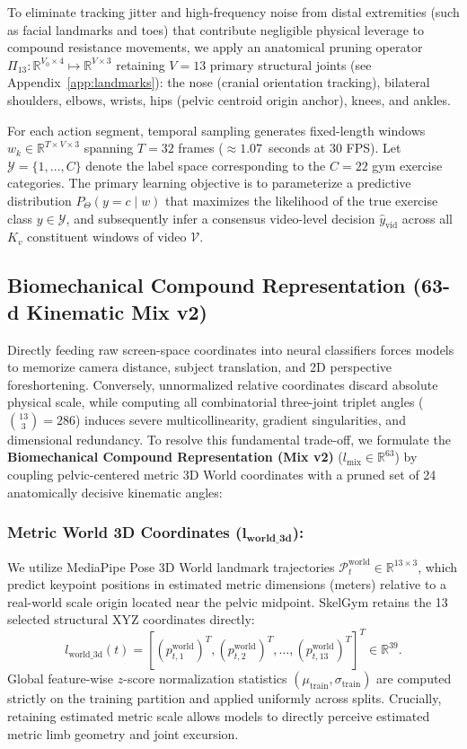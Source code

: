 \documentclass[preprint,12pt]{elsarticle}
\begin{document}
To eliminate tracking jitter and high-frequency noise from distal extremities (such as facial landmarks and toes) that contribute negligible physical leverage to compound resistance movements, we apply an anatomical pruning operator $\Pi_{13}: \mathbb{R}^{V_0 \times 4} \mapsto \mathbb{R}^{V \times 3}$ retaining $V = 13$ primary structural joints (see Appendix~\ref{app:landmarks}): the nose (cranial orientation tracking), bilateral shoulders, elbows, wrists, hips (pelvic centroid origin anchor), knees, and ankles.

For each action segment, temporal sampling generates fixed-length windows $w_k \in \mathbb{R}^{T \times V \times 3}$ spanning $T = 32$ frames ($\approx 1.07$~seconds at 30 FPS). Let $\mathcal{Y} = \{1, \dots, C\}$ denote the label space corresponding to the $C = 22$ gym exercise categories. The primary learning objective is to parameterize a predictive distribution $P_\Theta(y = c \mid w)$ that maximizes the likelihood of the true exercise class $y \in \mathcal{Y}$, and subsequently infer a consensus video-level decision $\hat{y}_{\text{vid}}$ across all $K_v$ constituent windows of video $\mathcal{V}$.

\subsection{Biomechanical Compound Representation (63-d Kinematic Mix v2)}
Directly feeding raw screen-space coordinates into neural classifiers forces models to memorize camera distance, subject translation, and 2D perspective foreshortening. Conversely, unnormalized relative coordinates discard absolute physical scale, while computing all combinatorial three-joint triplet angles ($\binom{13}{3} = 286$) induces severe multicollinearity, gradient singularities, and dimensional redundancy. To resolve this fundamental trade-off, we formulate the \textbf{Biomechanical Compound Representation (Mix v2)} ($l_{\text{mix}} \in \mathbb{R}^{63}$) by coupling pelvic-centered metric 3D World coordinates with a pruned set of 24 anatomically decisive kinematic angles:

\subsubsection{Metric World 3D Coordinates ($\mathbf{l_{\text{world\_3d}}}$):}
We utilize MediaPipe Pose 3D World landmark trajectories $\mathcal{P}_t^{\text{world}} \in \mathbb{R}^{13 \times 3}$, which predict keypoint positions in estimated metric dimensions (meters) relative to a real-world scale origin located near the pelvic midpoint. SkelGym retains the 13 selected structural XYZ coordinates directly:
\begin{equation}
    l_{\text{world\_3d}}(t) = \left[ (p_{t, 1}^{\text{world}})^T, (p_{t, 2}^{\text{world}})^T, \dots, (p_{t, 13}^{\text{world}})^T \right]^T \in \mathbb{R}^{39}.
\end{equation}
Global feature-wise $z$-score normalization statistics $(\mu_{\text{train}}, \sigma_{\text{train}})$ are computed strictly on the training partition and applied uniformly across splits. Crucially, retaining estimated metric scale allows models to directly perceive estimated metric limb geometry and joint excursion.
\end{document}
